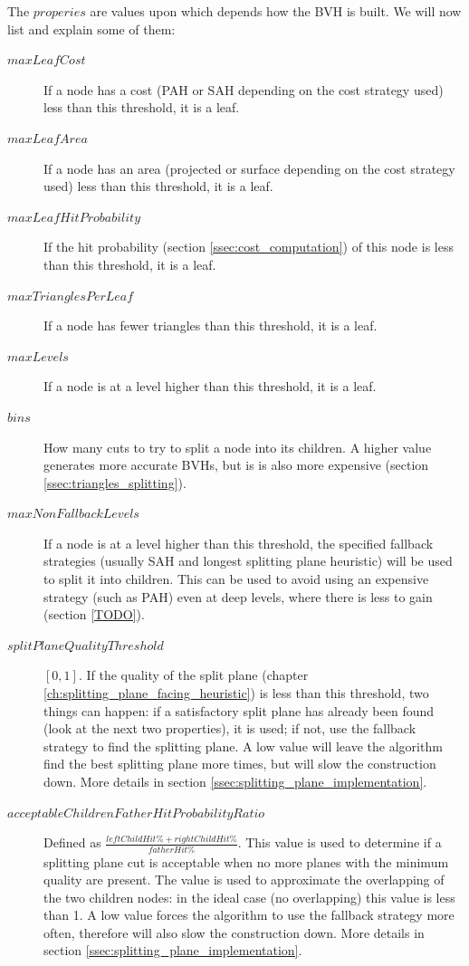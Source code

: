 \documentclass{PoliMi_MasterThesis}
\begin{document}
The $properies$ are values upon which depends how the BVH is built. We will now list and explain some of them:
\begin{description} 
	\item[\boldmath$maxLeafCost$] If a node has a cost (PAH or SAH depending on the cost strategy used) less than this threshold, it is a leaf.
	\item[\boldmath$maxLeafArea$] If a node has an area (projected or surface depending on the cost strategy used) less than this threshold, it is a leaf.
	\item[\boldmath$maxLeafHitProbability$] If the hit probability (section \ref{ssec:cost_computation}) of this node is less than this threshold, it is a leaf.
	\item[\boldmath$maxTrianglesPerLeaf$] If a node has fewer triangles than this threshold, it is a leaf.
	\item[\boldmath$maxLevels$] If a node is at a level higher than this threshold, it is a leaf.
	\item[\boldmath$bins$] How many cuts to try to split a node into its children. A higher value generates more accurate BVHs, but is is also more expensive (section \ref{ssec:triangles_splitting}).
	\item[\boldmath$maxNonFallbackLevels$] If a node is at a level higher than this threshold, the specified fallback strategies (usually SAH and longest splitting plane heuristic) will be used to split it into children. This can be used to avoid using an expensive strategy (such as PAH) even at deep levels, where there is less to gain (section \ref{TODO}).
	\item[\boldmath$splitPlaneQualityThreshold$] $[0, 1]$. If the quality of the split plane (chapter \ref{ch:splitting_plane_facing_heuristic}) is less than this threshold, two things can happen: if a satisfactory split plane has already been found (look at the next two properties), it is used; if not, use the fallback strategy to find the splitting plane. A low value will leave the algorithm find the best splitting plane more times, but will slow the construction down. More details in section \ref{ssec:splitting_plane_implementation}.
	\item[\boldmath$acceptableChildrenFatherHitProbabilityRatio$] Defined as $\frac{leftChildHit\% + rightChildHit\%}{fatherHit\%}$. This value is used to determine if a splitting plane cut is acceptable when no more planes with the minimum quality are present. The value is used to approximate the overlapping of the two children nodes: in the ideal case (no overlapping) this value is less than 1. A low value forces the algorithm to use the fallback strategy more often, therefore will also slow the construction down. More details in section \ref{ssec:splitting_plane_implementation}.

\end{description}
\end{document}
